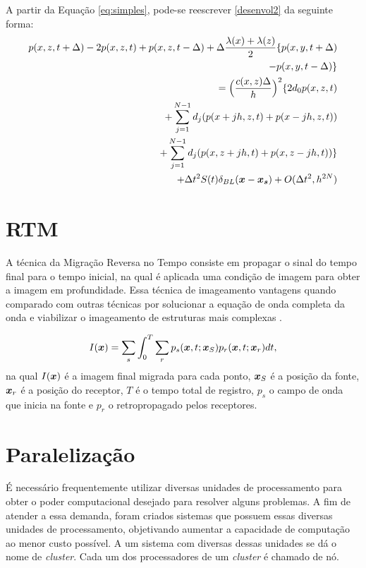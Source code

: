 A partir da Equação \ref{eq:simples}, pode-se reescrever \ref{desenvol2} da seguinte forma:
\begin{equation}
\begin{aligned}
p(x,z,t+\Delta)-2p(x,z,t)+p(x,z,t-\Delta)+\Delta\frac{\lambda(x)+\lambda(z)}{2}\{p(x,y,t+\Delta) \\
-p(x,y,t-\Delta)\}\\
=\Big{(}\frac{c(x,z)\Delta}{h}\Big{)}^2\{2d_0p(x,z,t) \\
+ \sum_{j=1}^{N-1}d_j(p(x+jh,z,t)+p(x-jh,z,t))\\
+ \sum_{j=1}^{N-1}d_j(p(x,z+jh,t)+p(x,z-jh,t))\} \\
+\Delta t^2S(t)\delta_{BL}(\boldsymbol{x}-\boldsymbol{x_s})+O(\Delta t^2,h^{2N})
\end{aligned}
\end{equation}

\section{RTM}
 
A técnica da Migração Reversa no Tempo consiste em propagar o sinal do tempo final para o tempo inicial, na qual é aplicada uma
condição de imagem para obter a imagem em profundidade. Essa técnica de imageamento vantagens quando comparado com outras
técnicas por solucionar a equação de onda completa da onda e viabilizar o imageamento de
estruturas mais complexas \citep{matias}.

\begin{equation}
	I(\boldsymbol{x})=\sum_{s}\int_{0}^{T}\sum_{r}p_s(\boldsymbol{x},t;\boldsymbol{x}_S)p_r(\boldsymbol{x},t;\boldsymbol{x}_r)dt,
\end{equation}
na qual $I(\boldsymbol{x})$ é a imagem final migrada para cada ponto, $\boldsymbol{x}_S$ é a posição da fonte, $\boldsymbol{x}_r$ é a posição do receptor, $T$ é o tempo total de registro, $p_s$ o campo de onda que inicia na fonte e $p_r$ o retropropagado pelos receptores.

\section{Paralelização}

É necessário frequentemente utilizar diversas unidades de processamento para obter o poder computacional desejado para resolver alguns problemas. A fim de atender a essa demanda, foram criados sistemas que possuem essas diversas unidades de processamento, objetivando aumentar a capacidade de computação ao menor custo possível. A um sistema com diversas dessas unidades se dá o nome de \textit{cluster}. Cada um dos processadores de um \textit{cluster} é chamado de nó.

